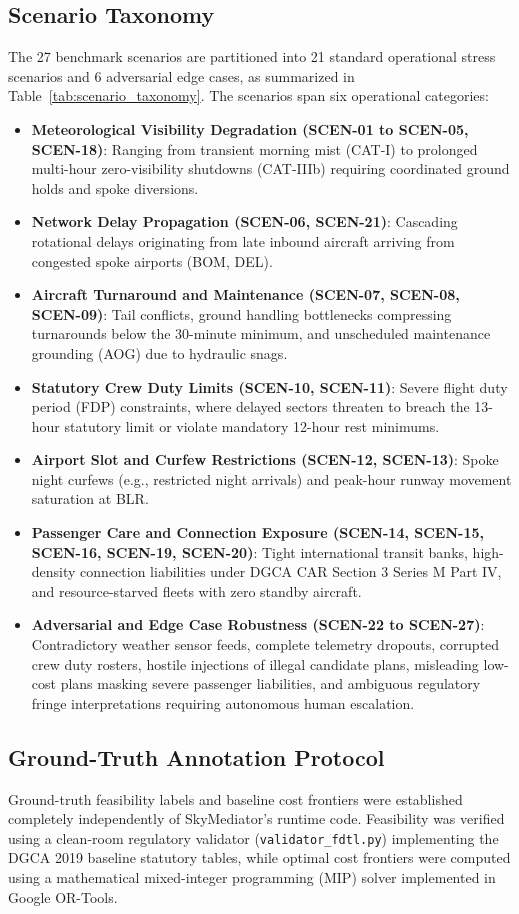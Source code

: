 \subsection{Scenario Taxonomy}
The 27 benchmark scenarios are partitioned into 21 standard operational stress scenarios and 6 adversarial edge cases, as summarized in Table~\ref{tab:scenario_taxonomy}. The scenarios span six operational categories:
\begin{itemize}
    \item \textbf{Meteorological Visibility Degradation (SCEN-01 to SCEN-05, SCEN-18)}: Ranging from transient morning mist (CAT-I) to prolonged multi-hour zero-visibility shutdowns (CAT-IIIb) requiring coordinated ground holds and spoke diversions.
    \item \textbf{Network Delay Propagation (SCEN-06, SCEN-21)}: Cascading rotational delays originating from late inbound aircraft arriving from congested spoke airports (BOM, DEL).
    \item \textbf{Aircraft Turnaround and Maintenance (SCEN-07, SCEN-08, SCEN-09)}: Tail conflicts, ground handling bottlenecks compressing turnarounds below the 30-minute minimum, and unscheduled maintenance grounding (AOG) due to hydraulic snags.
    \item \textbf{Statutory Crew Duty Limits (SCEN-10, SCEN-11)}: Severe flight duty period (FDP) constraints, where delayed sectors threaten to breach the 13-hour statutory limit or violate mandatory 12-hour rest minimums.
    \item \textbf{Airport Slot and Curfew Restrictions (SCEN-12, SCEN-13)}: Spoke night curfews (e.g., restricted night arrivals) and peak-hour runway movement saturation at BLR.
    \item \textbf{Passenger Care and Connection Exposure (SCEN-14, SCEN-15, SCEN-16, SCEN-19, SCEN-20)}: Tight international transit banks, high-density connection liabilities under DGCA CAR Section 3 Series M Part IV, and resource-starved fleets with zero standby aircraft.
    \item \textbf{Adversarial and Edge Case Robustness (SCEN-22 to SCEN-27)}: Contradictory weather sensor feeds, complete telemetry dropouts, corrupted crew duty rosters, hostile injections of illegal candidate plans, misleading low-cost plans masking severe passenger liabilities, and ambiguous regulatory fringe interpretations requiring autonomous human escalation.
\end{itemize}

\subsection{Ground-Truth Annotation Protocol}
Ground-truth feasibility labels and baseline cost frontiers were established completely independently of SkyMediator's runtime code. Feasibility was verified using a clean-room regulatory validator (\texttt{validator\_fdtl.py}) implementing the DGCA 2019 baseline statutory tables, while optimal cost frontiers were computed using a mathematical mixed-integer programming (MIP) solver implemented in Google OR-Tools.

